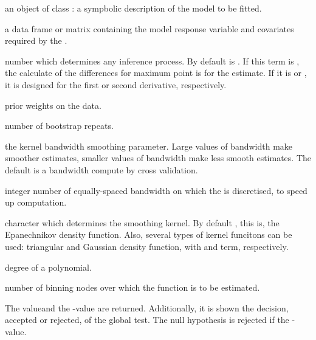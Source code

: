\begin{Arguments}
\begin{ldescription}
\item[\code{formula}] an object of class : a sympbolic description of the model to be fitted.

\item[\code{data}] a data frame or matrix containing the model response variable and covariates required by the .
 
\item[\code{der}] number which determines any inference process. By default  is . If this term is , the calculate of the differences for maximum point is for the estimate. If it is  or , it is designed for the first or second derivative, respectively.

\item[\code{weights}] prior weights on the data.
 
\item[\code{nboot}] number of bootstrap repeats.

\item[\code{h}] the kernel bandwidth smoothing parameter. Large values of bandwidth make smoother estimates, smaller values of bandwidth make less smooth estimates. The default is a bandwidth compute by cross validation.
 
\item[\code{nh}] integer number of equally-spaced bandwidth on which the  is discretised, to speed up computation.

\item[\code{kernel}] character which determines the smoothing kernel. By default , this is, the Epanechnikov density function. Also, several types of kernel funcitons can be used:  triangular and Gaussian density function, with  and  term, respectively.
  
\item[\code{p}] degree of a polynomial.

\item[\code{kbin}] number of binning nodes over which the function is to be estimated.

\end{ldescription}
\end{Arguments}
%
\begin{Value}

The  valueand the -value  are returned. Additionally, it is shown the decision, accepted or rejected, of the global test. The null hypothesis is rejected if the -value.  

\end{Value}
